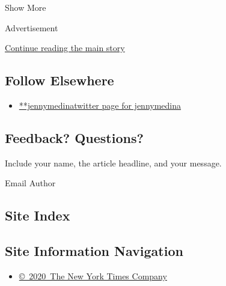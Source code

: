 Show More

Advertisement

\protect\hyperlink{after-mid2}{Continue reading the main story}

\hypertarget{follow-elsewhere}{%
\subsection{Follow Elsewhere}\label{follow-elsewhere}}

\begin{itemize}
\tightlist
\item
  \href{https://twitter.com/jennymedina}{**jennymedinatwitter page for
  jennymedina}
\end{itemize}

\hypertarget{feedback-questions}{%
\subsection{Feedback? Questions?}\label{feedback-questions}}

Include your name, the article headline, and your message.

Email Author

\hypertarget{site-index}{%
\subsection{Site Index}\label{site-index}}

\hypertarget{site-information-navigation}{%
\subsection{Site Information
Navigation}\label{site-information-navigation}}

\begin{itemize}
\tightlist
\item
  \href{https://help.nytimes.com/hc/en-us/articles/115014792127-Copyright-notice}{©~2020~The
  New York Times Company}
\end{itemize}

